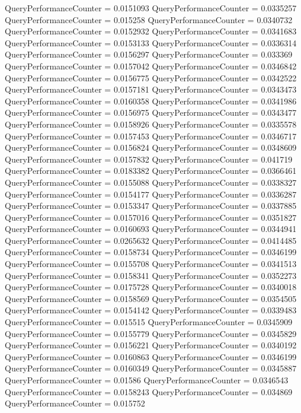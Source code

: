 \documentclass[9pt]{article}
\theoremstyle{plain}
\theoremstyle{definition}
\theoremstyle{remark}
\numberwithin{equation}{section}
\begin{document}
QueryPerformanceCounter  =  0.0151093
QueryPerformanceCounter  =  0.0335257
QueryPerformanceCounter  =  0.015258
QueryPerformanceCounter  =  0.0340732
QueryPerformanceCounter  =  0.0152932
QueryPerformanceCounter  =  0.0341683
QueryPerformanceCounter  =  0.0153133
QueryPerformanceCounter  =  0.0336314
QueryPerformanceCounter  =  0.0156297
QueryPerformanceCounter  =  0.033369
QueryPerformanceCounter  =  0.0157042
QueryPerformanceCounter  =  0.0346842
QueryPerformanceCounter  =  0.0156775
QueryPerformanceCounter  =  0.0342522
QueryPerformanceCounter  =  0.0157181
QueryPerformanceCounter  =  0.0343473
QueryPerformanceCounter  =  0.0160358
QueryPerformanceCounter  =  0.0341986
QueryPerformanceCounter  =  0.0156975
QueryPerformanceCounter  =  0.0343477
QueryPerformanceCounter  =  0.0158926
QueryPerformanceCounter  =  0.0335578
QueryPerformanceCounter  =  0.0157453
QueryPerformanceCounter  =  0.0346717
QueryPerformanceCounter  =  0.0156824
QueryPerformanceCounter  =  0.0348609
QueryPerformanceCounter  =  0.0157832
QueryPerformanceCounter  =  0.041719
QueryPerformanceCounter  =  0.0183382
QueryPerformanceCounter  =  0.0366461
QueryPerformanceCounter  =  0.0155088
QueryPerformanceCounter  =  0.0338327
QueryPerformanceCounter  =  0.0154177
QueryPerformanceCounter  =  0.0336287
QueryPerformanceCounter  =  0.0153347
QueryPerformanceCounter  =  0.0337885
QueryPerformanceCounter  =  0.0157016
QueryPerformanceCounter  =  0.0351827
QueryPerformanceCounter  =  0.0160693
QueryPerformanceCounter  =  0.0344941
QueryPerformanceCounter  =  0.0265632
QueryPerformanceCounter  =  0.0414485
QueryPerformanceCounter  =  0.0158734
QueryPerformanceCounter  =  0.0346199
QueryPerformanceCounter  =  0.0155708
QueryPerformanceCounter  =  0.0341513
QueryPerformanceCounter  =  0.0158341
QueryPerformanceCounter  =  0.0352273
QueryPerformanceCounter  =  0.0175728
QueryPerformanceCounter  =  0.0340018
QueryPerformanceCounter  =  0.0158569
QueryPerformanceCounter  =  0.0354505
QueryPerformanceCounter  =  0.0154142
QueryPerformanceCounter  =  0.0339483
QueryPerformanceCounter  =  0.015515
QueryPerformanceCounter  =  0.0345909
QueryPerformanceCounter  =  0.0155779
QueryPerformanceCounter  =  0.0345829
QueryPerformanceCounter  =  0.0156221
QueryPerformanceCounter  =  0.0340192
QueryPerformanceCounter  =  0.0160863
QueryPerformanceCounter  =  0.0346199
QueryPerformanceCounter  =  0.0160349
QueryPerformanceCounter  =  0.0345887
QueryPerformanceCounter  =  0.01586
QueryPerformanceCounter  =  0.0346543
QueryPerformanceCounter  =  0.0158243
QueryPerformanceCounter  =  0.034869
QueryPerformanceCounter  =  0.015752
\end{document}
